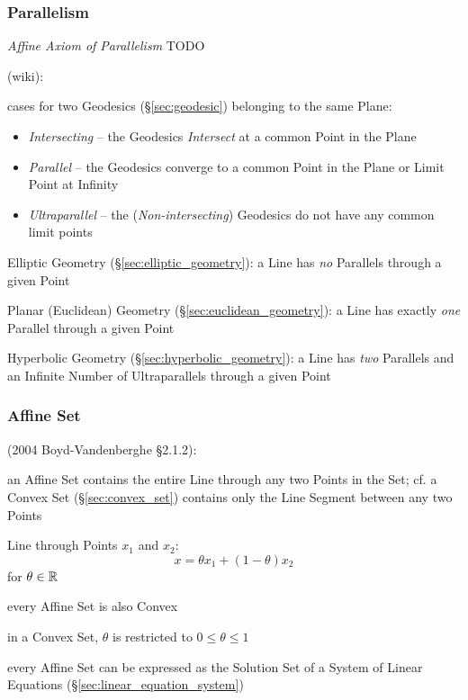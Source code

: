 \subsubsection{Parallelism}\label{sec:parallelism}

\emph{Affine Axiom of Parallelism} TODO

\asterism

(wiki):

cases for two Geodesics (\S\ref{sec:geodesic}) belonging to the same Plane:
\begin{itemize}
  \item \emph{Intersecting} -- the Geodesics \emph{Intersect} at a common Point
    in the Plane
  \item \emph{Parallel} -- the Geodesics converge to a common Point in the Plane
    or Limit Point at Infinity
  \item \emph{Ultraparallel} -- the (\emph{Non-intersecting}) Geodesics do not
    have any common limit points
\end{itemize}

\asterism

\fist Elliptic Geometry (\S\ref{sec:elliptic_geometry}): a Line has \emph{no}
  Parallels through a given Point

\fist Planar (Euclidean) Geometry (\S\ref{sec:euclidean_geometry}): a Line has
  exactly \emph{one} Parallel through a given Point

\fist Hyperbolic Geometry (\S\ref{sec:hyperbolic_geometry}): a Line has
\emph{two} Parallels and an Infinite Number of Ultraparallels through a
given Point



\subsubsection{Affine Set}\label{sec:affine_set}

(2004 Boyd-Vandenberghe \S2.1.2):

an Affine Set contains the entire Line through any two Points in the Set; cf. a
Convex Set (\S\ref{sec:convex_set}) contains only the Line Segment between any
two Points

Line through Points $x_1$ and $x_2$:
\[
  x = \theta x_1 + (1-\theta) x_2
\]
for $\theta \in \mathbb{R}$

every Affine Set is also Convex

\fist in a Convex Set, $\theta$ is restricted to $0 \leq \theta \leq 1$

every Affine Set can be expressed as the Solution Set of a System of Linear
Equations (\S\ref{sec:linear_equation_system})


